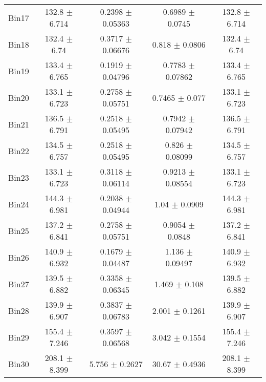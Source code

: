 \begin{tabular}{@{\extracolsep{4pt}}lcccc@{}}
     Bin17 & 132.8 $\pm$ 6.714 & 0.2398 $\pm$ 0.05363 & 0.6989 $\pm$ 0.0745 & 132.8 $\pm$ 6.714 \\ 
     Bin18 & 132.4 $\pm$ 6.74 & 0.3717 $\pm$ 0.06676 & 0.818 $\pm$ 0.0806 & 132.4 $\pm$ 6.74 \\ 
     Bin19 & 133.4 $\pm$ 6.765 & 0.1919 $\pm$ 0.04796 & 0.7783 $\pm$ 0.07862 & 133.4 $\pm$ 6.765 \\ 
     Bin20 & 133.1 $\pm$ 6.723 & 0.2758 $\pm$ 0.05751 & 0.7465 $\pm$ 0.077 & 133.1 $\pm$ 6.723 \\ 
     Bin21 & 136.5 $\pm$ 6.791 & 0.2518 $\pm$ 0.05495 & 0.7942 $\pm$ 0.07942 & 136.5 $\pm$ 6.791 \\ 
     Bin22 & 134.5 $\pm$ 6.757 & 0.2518 $\pm$ 0.05495 & 0.826 $\pm$ 0.08099 & 134.5 $\pm$ 6.757 \\ 
     Bin23 & 133.1 $\pm$ 6.723 & 0.3118 $\pm$ 0.06114 & 0.9213 $\pm$ 0.08554 & 133.1 $\pm$ 6.723 \\ 
     Bin24 & 144.3 $\pm$ 6.981 & 0.2038 $\pm$ 0.04944 & 1.04 $\pm$ 0.0909 & 144.3 $\pm$ 6.981 \\ 
     Bin25 & 137.2 $\pm$ 6.841 & 0.2758 $\pm$ 0.05751 & 0.9054 $\pm$ 0.0848 & 137.2 $\pm$ 6.841 \\ 
     Bin26 & 140.9 $\pm$ 6.932 & 0.1679 $\pm$ 0.04487 & 1.136 $\pm$ 0.09497 & 140.9 $\pm$ 6.932 \\ 
     Bin27 & 139.5 $\pm$ 6.882 & 0.3358 $\pm$ 0.06345 & 1.469 $\pm$ 0.108 & 139.5 $\pm$ 6.882 \\ 
     Bin28 & 139.9 $\pm$ 6.907 & 0.3837 $\pm$ 0.06783 & 2.001 $\pm$ 0.1261 & 139.9 $\pm$ 6.907 \\ 
     Bin29 & 155.4 $\pm$ 7.246 & 0.3597 $\pm$ 0.06568 & 3.042 $\pm$ 0.1554 & 155.4 $\pm$ 7.246 \\ 
     Bin30 & 208.1 $\pm$ 8.399 & 5.756 $\pm$ 0.2627 & 30.67 $\pm$ 0.4936 & 208.1 $\pm$ 8.399 \\ 
\hline\hline
  \end{tabular}

